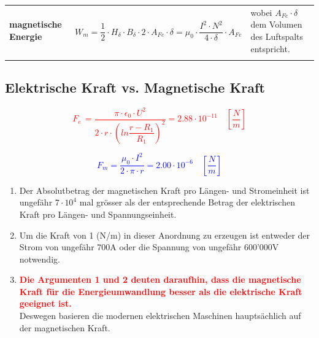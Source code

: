 \begin{longtable}{| p{} | p{} | p{} |}
        \textbf{magnetische Energie} & \begin{equation*}
        W_m = \dfrac{1}{2}\cdot H_\delta\cdot B_\delta\cdot2\cdot A_{Fe}\cdot\delta = \mu_0\cdot \dfrac{I^2\cdot N^2}{4\cdot\delta}\cdot A_{Fe}
        \end{equation*} & wobei $A_{Fe}\cdot\delta$ dem Volumen des Luftspalts entspricht. \\
        \lasthline
    \end{longtable}
    \clearpage
    \newpage

\subsection{Elektrische Kraft vs. Magnetische Kraft}
    \begin{minipage}{0.5\textwidth}
    	\centering
        \textcolor{red}{\begin{equation*}F_e\, = \dfrac{\pi\cdot\epsilon_0\cdot U^2}{2\cdot r\cdot\left(ln\dfrac{r-R_1}{R_1}\right)^2} = 2.88\cdot 10^{-11} \quad \left[\dfrac{N}{m}\right]\end{equation*}}
        \end{minipage}
        \begin{minipage}{0.5\textwidth}
        	\centering
        \textcolor{blue}{\begin{equation*}F_m = \dfrac{\mu_0\cdot I^2}{2\cdot\pi\cdot r} = 2.00 \cdot 10^{-6} \quad\left[\dfrac{N}{m}\right]\end{equation*}}
    \end{minipage}
    \begin{enumerate}
    	\item Der Absolutbetrag der magnetischen Kraft pro Längen- und Stromeinheit ist
    	ungefähr $7\cdot10^4$ mal grösser als der entsprechende Betrag der elektrischen Kraft
    	pro Längen- und Spannungseinheit.
    	\item Um die Kraft von 1 (N/m) in dieser Anordnung zu erzeugen ist entweder der
    	Strom von ungefähr 700A oder die Spannung von ungefähr 600’000V notwendig.
    	\item \textcolor{red}{\textbf{Die Argumenten 1 und 2 deuten daraufhin, dass die magnetische Kraft für die Energieumwandlung besser als die elektrische Kraft geeignet ist.}}\\[0.2cm]
    	Deswegen basieren die modernen elektrischen Maschinen hauptsächlich auf der magnetischen Kraft.
    \end{enumerate}
\clearpage
\newpage